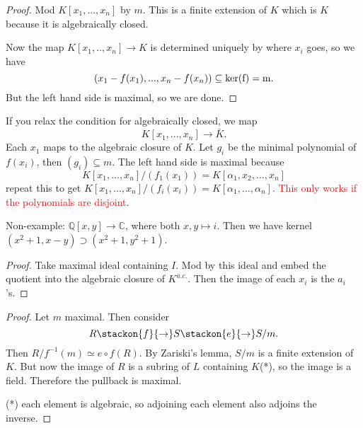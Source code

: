 \begin{proof}
    Mod $K[x_1,...,x_n]$ by $m$. This is a finite extension of $K$ which is $K$ because it is algebraically closed.
    
    Now the map $K[x_1,..,x_n]\to K$ is determined uniquely by where $x_i$ goes, so we have \[
    (x_1-f(x_1),...,x_n-f(x_n))\subseteq \rm{ker}(f)= m.
    \]
    But the left hand side is maximal, so we are done. 
\end{proof}

\begin{remark}
    If you relax the condition for algebraically closed, we map \[
    K[x_1,...,x_n]\to \bar{K}.
    \]
    Each $x_1$ maps to the algebraic closure of $K$. 
    Let $g_i$ be the minimal polynomial of $f(x_i)$, then $(g_i)\subseteq m$. The left hand side is maximal because \[
    K[x_1,...,x_n]/(f_1(x_1))=K[\alpha_1,x_2,...,x_n]
    \]
    repeat this to get $K[x_1,...,x_n]/(f_i(x_i))=K[\alpha_1,...,\alpha_n]$.
    \textcolor{red}{This only works if the polynomials are disjoint}.

    Non-example: $\mathbb{Q}[x,y]\to \mathbb{C}$, where both $x,y\mapsto i$. Then we have kernel $(x^2+1,x-y)\supset (x^2+1,y^2+1)$.
\end{remark}


\begin{proof}
    Take maximal ideal containing $I$. Mod by this ideal and embed the quotient into the algebraic closure of $K^{a.c.}$. Then the image of each $x_i$ is the $a_i$'s.
\end{proof}

\begin{proof}
    Let $m$ maximal. Then consider \[
    R\stackon{f}{\to} S\stackon{e}{\to} S/m.
    \]
    Then $R/f^{-1}(m)\simeq e\circ f (R)$. By Zariski's lemma, $S/m$ is a finite extension of $K$. But now  the image of $R$ is a subring of $L$ containing $K$(*), so the image is a field. Therefore the pullback is maximal.


    (*) each element is algebraic, so adjoining each element also adjoins the inverse.
\end{proof}